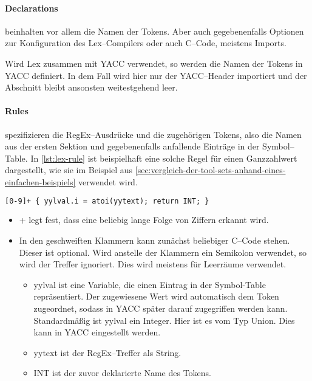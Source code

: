 \paragraph{Declarations} beinhalten vor allem die Namen der Tokens.
Aber auch gegebenenfalls Optionen zur Konfiguration des Lex--Compilers oder auch C--Code, meistens Imports.

Wird Lex zusammen mit \ac{YACC} verwendet, so werden die Namen der Tokens in \ac{YACC} definiert.
In dem Fall wird hier nur der \ac{YACC}--Header importiert und der Abschnitt bleibt ansonsten weitestgehend leer.

\paragraph{Rules} spezifizieren die \ac{RegEx}--Ausdrücke und die zugehörigen Tokens, also die Namen aus der ersten Sektion und gegebenenfalls anfallende Einträge in der Symbol--Table.
In \autoref{lst:lex-rule} ist beispielhaft eine solche Regel für einen Ganzzahlwert dargestellt, wie sie im Beispiel aus \autoref{sec:vergleich-der-tool-sets-anhand-eines-einfachen-beispiels} verwendet wird.
\begin{lstlisting}[label={lst:lex-rule},caption={Lex Regel},language=lex]
[0-9]+ { yylval.i = atoi(yytext); return INT; }
\end{lstlisting}
\begin{itemize}
    \item {\ttfamily [0-9]+} legt fest, dass eine beliebig lange Folge von Ziffern erkannt wird.
    \item In den geschweiften Klammern kann zunächst beliebiger C--Code stehen.
    Dieser ist optional.
    Wird anstelle der Klammern ein Semikolon verwendet, so wird der Treffer ignoriert.
    Dies wird meistens für Leerräume verwendet.
    \begin{itemize}
        \item {\ttfamily yylval} ist eine Variable, die einen Eintrag in der Symbol-Table repräsentiert.
        Der zugewiesene Wert wird automatisch dem Token zugeordnet, sodass in \ac{YACC} später darauf zugegriffen werden kann.
        Standardmäßig ist {\ttfamily yylval} ein Integer.
        Hier ist es vom Typ Union.
        Dies kann in \ac{YACC} eingestellt werden.
        \item {\ttfamily yytext} ist der \acs{RegEx}--Treffer als String.
        \item {\ttfamily INT} ist der zuvor deklarierte Name des Tokens.
    \end{itemize}
\end{itemize}

